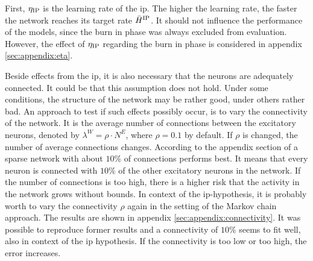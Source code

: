 First, $\eta_{\text{IP}}$ is the learning rate of the \acl{ip}. The higher the learning rate, the faster the network reaches its target rate $\bar H^{\text{IP}}$. It should not influence the performance of the models, since the burn in phase was always excluded from evaluation. However, the effect of $\eta_{\text{IP}}$ regarding the burn in phase is considered in appendix \ref{sec:appendix:eta}.

Beside effects from the \acl{ip}, it is also necessary that the neurons are adequately connected. It could be that this assumption does not hold. Under some conditions, the structure of the network may be rather good, under others rather bad. An approach to test if such effects possibly occur, is to vary the connectivity of the network. It is the average number of connections between the excitatory neurons, denoted by $\lambda^W = \rho \cdot N^E$, where $\rho = 0.1$ by default. If $\rho$ is changed, the number of average connections changes. According to the appendix section of \textcite{lazar2009sorn} a sparse network with about $10\%$ of connections performs best. It means that every neuron is connected with $10\%$ of the other excitatory neurons in the network. If the number of connections is too high, there is a higher risk that the activity in the network grows without bounds. In context of the \acs{ip}-hypothesis, it is probably worth to vary the connectivity $\rho$ again in the setting of the Markov chain approach. The results are shown in appendix \ref{sec:appendix:connectivity}. It was possible to reproduce former results and a connectivity of $10\%$ seems to fit well, also in context of the \acs{ip} hypothesis. If the connectivity is too low or too high, the error increases.



